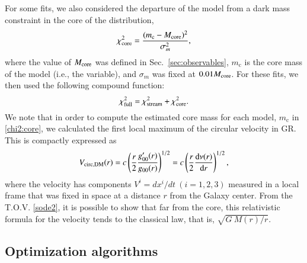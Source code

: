 \documentclass[referee]{aa} %
\begin{document}
For some fits, we also considered the departure of the model from a dark mass constraint in the core
of the distribution,
\begin{equation}
   \label{chi2:core}
\chi^2_{\rm{core}}=\frac{(m_\mathrm{c}-M_{\rm{core}})^2}{\sigma_m^2},
\end{equation}
where the value of $M_{\rm{core}}$ was defined in Sec.~\ref{sec:observables}, $m_\mathrm{c}$ is the core mass of the model (i.e., the variable), and
$\sigma_m$ was fixed at $0.01 M_{\rm{core}}$.
For these fits, we then used the following compound function:
\begin{equation}
   \label{chi2:full}
\chi^2_{\rm{full}}=\chi^2_{\rm{stream}}+\chi^2_{\rm{core}}.
\end{equation}
We note that in order to compute the estimated core mass for each model, $m_\mathrm{c}$ in \cref{chi2:core}, we calculated the first local maximum of the circular velocity in GR. This is compactly expressed as
\begin{equation}
   \label{v_circ_dm}
   V_{\rm{circ, DM}}(r)= c\left(\frac{r}{2}\frac{g_{00}'(r)}{g_{00}(r)}\right)^{1/2} =
                        c\left(\frac{r}{2}\frac{\mathrm{d}\nu(r)}{\mathrm{d}r}\right)^{1/2},
\end{equation}
where the velocity has components $V^i=dx^i/dt~(i=1,2,3)$ measured in a local frame that was fixed in space at a distance $r$ from the Galaxy center. From the T.O.V. \cref{sode2}, it is possible to show that far from the core, this relativistic formula for the velocity tends to the classical law, that is, $\sqrt{G~M(r)/r}$.

\subsection{Optimization algorithms}
\label{sec:optimization}
\end{document}
